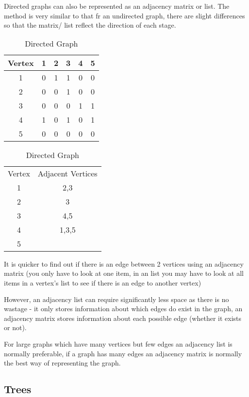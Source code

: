   Directed graphs can also be represented as an adjacency matrix or list. The method is very similar to that fr an undirected graph, there are slight differences so that the matrix/ list reflect the direction of each stage.
  \begin{table}[h]
  	\caption{Directed Graph}
  	\begin{tabular}{c | c c c c c}
  		Vertex	&	1	&	2	&	3	&	4	&	5 	\\ \hline
  		1		&	0	&	1	&	1	&	0	&	0	\\
  		2		&	0	&	0	&	1	&	0	&	0	\\
  		3		&	0	&	0	&	0	&	1	&	1	\\
  		4		&	1	&	0	&	1	&	0	&	1	\\
  		5		&	0	&	0	&	0	&	0	&	0	\\
  	\end{tabular}
  \end{table}
  \begin{table}[h]
  	\caption{Directed Graph}
  	\begin{tabular}{cc}
  		Vertex	&	Adjacent Vertices \\
  		1		&	2,3	\\
  		2		&	3	\\
  		3		&	4,5	\\
  		4		&	1,3,5	\\
  		5		&		\\
  	\end{tabular}
  \end{table}


  It is quicker to find out if there is an edge between 2 vertices using an adjacency matrix (you only have to look at one item, in an list you may have to look at all items in a vertex's list to see if there is an edge to another vertex)
  
  However, an adjacency list can require significantly less space as there is no wastage - it only stores information about which edges do exist in the graph, an adjacency matrix stores information about each possible edge (whether it exists or not).
  
  For large graphs which have many vertices but few edges an adjacency list is normally preferable, if a graph has many edges an adjacency matrix is normally the best way of representing the graph.
  
  
\subsection{Trees}
  
